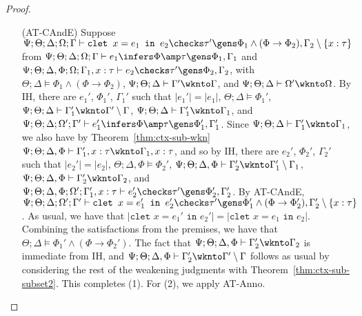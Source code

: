 \begin{proof}
\begin{itemize}
  \item[(AT-CAndE)] Suppose
  $\Psi ; \Theta ; \Delta ; \Omega ; \Gamma \vdash \texttt{clet } x = e_1 \texttt{ in } e_2 \checks \tau' \gens \Phi_1 \wedge (\Phi \to \Phi_2),\Gamma_2 \setminus \{x : \tau\}$ from
  $\Psi ; \Theta ; \Delta ; \Omega ; \Gamma \vdash e_1 \infers \Phi \amp \tau \gens \Phi_1,\Gamma_1$ and
  $\Psi ; \Theta ; \Delta, \Phi ; \Omega ; \Gamma_1, x : \tau \vdash e_2 \checks \tau' \gens \Phi_2, \Gamma_2$, with
  $\Theta ; \Delta \vDash \Phi_1 \wedge (\Phi \to \Phi_2)$,
  $\Psi ; \Theta ; \Delta \vdash \Gamma' \wknto \Gamma$, and
  $\Psi ; \Theta ; \Delta \vdash \Omega' \wknto \Omega$.
  By IH, there are $e_1'$, $\Phi_1'$, $\Gamma_1'$ such that
  $|e_1'| = |e_1|$,
  $\Theta ; \Delta \vDash \Phi_1'$,
  $\Psi ; \Theta ; \Delta \vdash \Gamma_1' \wknto \Gamma' \setminus \Gamma$,
  $\Psi ; \Theta ; \Delta \vdash \Gamma_1' \wknto \Gamma_1$, and
  $\Psi ; \Theta ; \Delta ; \Omega' ; \Gamma' \vdash e_1' \infers \Phi \amp \tau \gens \Phi_1',\Gamma_1'$.
  Since $\Psi ; \Theta ; \Delta \vdash \Gamma_1' \wknto \Gamma_1$, we also have by Theorem~\ref{thm:ctx-sub-wkn}
  $\Psi ; \Theta ; \Delta, \Phi \vdash \Gamma_1', x : \tau \wknto \Gamma_1, x : \tau$,
  and so by IH, there are $e_2'$, $\Phi_2'$, $\Gamma_2'$ such that
  $|e_2'| = |e_2|$,
  $\Theta ; \Delta, \Phi \vDash \Phi_2'$,
  $\Psi ; \Theta ; \Delta, \Phi \vdash \Gamma_2' \wknto \Gamma_1' \setminus \Gamma_1$,
  $\Psi ; \Theta ; \Delta, \Phi \vdash \Gamma_2' \wknto \Gamma_2$, and
  $\Psi ; \Theta ; \Delta, \Phi ; \Omega' ; \Gamma_1', x : \tau \vdash e_2' \checks \tau' \gens \Phi_2', \Gamma_2'$.
  By AT-CAndE,
  $\Psi ; \Theta ; \Delta ; \Omega' ; \Gamma' \vdash \texttt{clet } x = e_1' \texttt{ in } e_2' \checks \tau' \gens \Phi_1' \wedge (\Phi \to \Phi_2'),\Gamma_2' \setminus \{x : \tau\}$.
  As usual, we have that $|\texttt{clet } x = e_1' \texttt{ in } e_2'| = |\texttt{clet } x = e_1 \texttt{ in } e_2|$.
  Combining the satisfactions from the premises, we have that $\Theta ; \Delta \vDash \Phi_1' \wedge (\Phi \to \Phi_2')$.
  The fact that $\Psi ; \Theta ; \Delta, \Phi \vdash \Gamma_2' \wknto \Gamma_2$ is immediate from IH, 
  and $\Psi ; \Theta ; \Delta, \Phi \vdash \Gamma_2' \wknto \Gamma' \setminus \Gamma$ follows as usual by considering the rest
  of the weakening judgments with Theorem~\ref{thm:ctx-sub-subset2}. This completes (1). For (2), we apply AT-Anno.
   

\end{itemize}
\end{proof}
